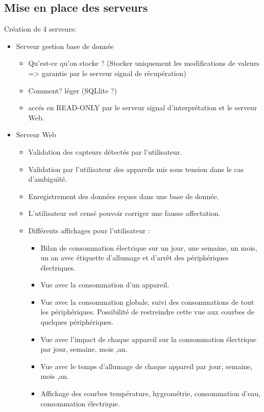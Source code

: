 \documentclass[10pt,a4paper]{article}
\begin{document}
\subsection{Mise en place des serveurs}

Création de 4 serveurs:

\begin{itemize}
  \item Serveur gestion base de donnée
  \begin{itemize}
    \item Qu'est-ce qu'on stocke ? (Stocker uniquement les modifications de valeurs => garantie par le serveur signal de récupération)
    \item Comment? léger (SQLlite ?)
    \item accés en READ-ONLY par le serveur signal d'interprétation et le serveur Web.
  \end{itemize}
\end{itemize}

\begin{itemize}
  \item Serveur Web
  \begin{itemize}
    \item Validation des capteurs détectés par l'utilisateur.
    \item Validation par l'utilisateur des appareils mis sous tension dans le cas d'ambiguïté.
    \item Enregistrement des données reçues dans une base de donnée.
    \item L'utilisateur est censé pouvoir corriger une fausse affectation.
    \item Différents affichages pour l'utilisateur :
    \begin{itemize}
      \item Bilan de consommation électrique sur un jour, une semaine, un mois, un an avec étiquette d'allumage et d'arrêt des périphériques électriques.
      \item Vue avec la consommation d'un appareil.
      \item Vue avec la consommation globale, suivi des consommations de tout les périphériques. Possibilité de restreindre cette vue aux courbes de quelques périphériques.
      \item Vue avec l'impact de chaque appareil sur la consommation électrique par jour, semaine, mois ,an.
      \item Vue avec le temps d'allumage de chaque appareil par jour, semaine, mois ,an.
      \item Affichage des courbes température, hygrométrie, consommation d'eau, consommation électrique.
    \end{itemize}
  \end{itemize}
\end{itemize}
\end{document}
